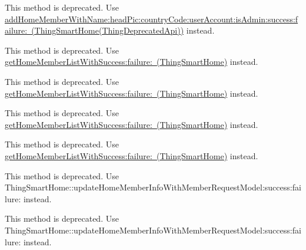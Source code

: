 \begin{DoxyRefList}
\label{deprecated__deprecated000047}%
%
This method is deprecated. Use \mbox{\hyperlink{category_thing_smart_home_07_thing_deprecated_api_08_aa06ed0850cb14733eb33f539a81e0650}{add\+Home\+Member\+With\+Name\+:head\+Pic\+:country\+Code\+:user\+Account\+:is\+Admin\+:success\+:failure\+: (\+Thing\+Smart\+Home(\+Thing\+Deprecated\+Api))}} instead.  
\item[(Thing\+Deprecated\+Api) Member \mbox{\hyperlink{category_thing_smart_home_member_07_thing_deprecated_api_08_a2a2024786d631b6116c8d66ffda49008}{\mbox{[}Thing\+Smart\+Home\+Member(Thing\+Deprecated\+Api) get\+Home\+Member\+List\+With\+Home\+Id\+:success\+:failure\+:\mbox{]}}} ]\label{deprecated__deprecated000048}%
%
This method is deprecated. Use \mbox{\hyperlink{interface_thing_smart_home_a85582a778fe4ce125dbf513c37d7e823}{get\+Home\+Member\+List\+With\+Success\+:failure\+: (\+Thing\+Smart\+Home)}} instead. 

\label{deprecated__deprecated000066}%
%
This method is deprecated. Use \mbox{\hyperlink{interface_thing_smart_home_a85582a778fe4ce125dbf513c37d7e823}{get\+Home\+Member\+List\+With\+Success\+:failure\+: (\+Thing\+Smart\+Home)}} instead. 

\label{deprecated__deprecated000012}%
%
This method is deprecated. Use \mbox{\hyperlink{interface_thing_smart_home_a85582a778fe4ce125dbf513c37d7e823}{get\+Home\+Member\+List\+With\+Success\+:failure\+: (\+Thing\+Smart\+Home)}} instead. 

\label{deprecated__deprecated000030}%
%
This method is deprecated. Use \mbox{\hyperlink{interface_thing_smart_home_a85582a778fe4ce125dbf513c37d7e823}{get\+Home\+Member\+List\+With\+Success\+:failure\+: (\+Thing\+Smart\+Home)}} instead.  
\item[(Thing\+Deprecated\+Api) Member \mbox{\hyperlink{category_thing_smart_home_member_07_thing_deprecated_api_08_a8f46aa9590fa9c14ff1ac03570707ed7}{\mbox{[}Thing\+Smart\+Home\+Member(Thing\+Deprecated\+Api) update\+Home\+Member\+Admin\+With\+Member\+Id\+:is\+Admin\+:success\+:failure\+:\mbox{]}}} ]\label{deprecated__deprecated000070}%
%
This method is deprecated. Use Thing\+Smart\+Home\+::update\+Home\+Member\+Info\+With\+Member\+Request\+Model\+:success\+:failure\+: instead. 

\label{deprecated__deprecated000034}%
%
This method is deprecated. Use Thing\+Smart\+Home\+::update\+Home\+Member\+Info\+With\+Member\+Request\+Model\+:success\+:failure\+: instead. 


\end{DoxyRefList}
